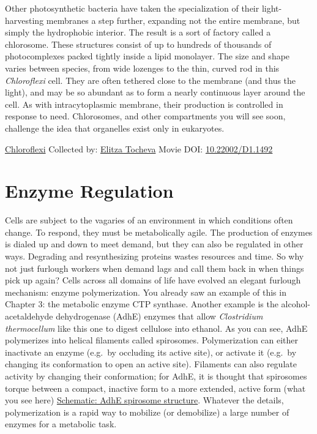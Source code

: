 \documentclass[]{tufte-book}
\begin{document}
Other photosynthetic bacteria have taken the specialization of their light-harvesting membranes a step further, expanding not the entire membrane, but simply the hydrophobic interior. The result is a sort of factory called a chlorosome. These structures consist of up to hundreds of thousands of photocomplexes packed tightly inside a lipid monolayer. The size and shape varies between species, from wide lozenges to the thin, curved rod in this \emph{Chloroflexi} cell. They are often tethered close to the membrane (and thus the light), and may be so abundant as to form a nearly continuous layer around the cell. As with intracytoplasmic membrane, their production is controlled in response to need. Chlorosomes, and other compartments you will see soon, challenge the idea that organelles exist only in eukaryotes.



\hypertarget{htmlwidget-422afcb8577e800c8716}{}

\label{fig:4-4}\protect\hyperlink{tree}{Chloroflexi} Collected by: \protect\hyperlink{elitza_tocheva}{Elitza Tocheva} Movie DOI: \href{https://doi.org/10.22002/D1.1492}{10.22002/D1.1492}

\hypertarget{enzyme-regulation}{%
\section{Enzyme Regulation}\label{enzyme-regulation}}

Cells are subject to the vagaries of an environment in which conditions often change. To respond, they must be metabolically agile. The production of enzymes is dialed up and down to meet demand, but they can also be regulated in other ways. Degrading and resynthesizing proteins wastes resources and time. So why not just furlough workers when demand lags and call them back in when things pick up again? Cells across all domains of life have evolved an elegant furlough mechanism: enzyme polymerization. You already saw an example of this in Chapter 3: the metabolic enzyme CTP synthase. Another example is the alcohol-acetaldehyde dehydrogenase (AdhE) enzymes that allow \emph{Clostridium thermocellum} like this one to digest cellulose into ethanol. As you can see, AdhE polymerizes into helical filaments called spirosomes. Polymerization can either inactivate an enzyme (e.g.~by occluding its active site), or activate it (e.g.~by changing its conformation to open an active site). Filaments can also regulate activity by changing their conformation; for AdhE, it is thought that spirosomes torque between a compact, inactive form to a more extended, active form (what you see here) \protect\hyperlink{AdhE_spirosome_structure}{Schematic: AdhE spirosome structure}. Whatever the details, polymerization is a rapid way to mobilize (or demobilize) a large number of enzymes for a metabolic task.
\end{document}
